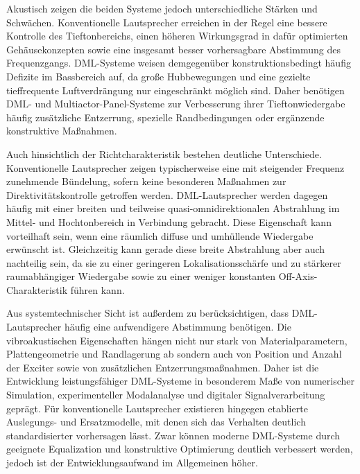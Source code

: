 Akustisch zeigen die beiden Systeme jedoch unterschiedliche Stärken und Schwächen. Konventionelle Lautsprecher erreichen in der Regel eine bessere Kontrolle des Tieftonbereichs, einen höheren Wirkungsgrad in dafür optimierten Gehäusekonzepten sowie eine insgesamt besser vorhersagbare Abstimmung des Frequenzgangs.
DML-Systeme weisen demgegenüber konstruktionsbedingt häufig Defizite im Bassbereich auf, da große Hubbewegungen und eine gezielte tieffrequente Luftverdrängung nur eingeschränkt möglich sind. Daher benötigen DML- und Multiactor-Panel-Systeme zur Verbesserung ihrer Tieftonwiedergabe häufig zusätzliche Entzerrung, spezielle Randbedingungen oder ergänzende konstruktive Maßnahmen.

Auch hinsichtlich der Richtcharakteristik bestehen deutliche Unterschiede. Konventionelle Lautsprecher zeigen typischerweise eine mit steigender Frequenz zunehmende Bündelung, sofern keine besonderen Maßnahmen zur Direktivitätskontrolle getroffen werden. DML-Lautsprecher werden dagegen häufig mit einer breiten und teilweise quasi-omnidirektionalen Abstrahlung im Mittel- und Hochtonbereich in Verbindung gebracht. Diese Eigenschaft kann vorteilhaft sein, wenn eine räumlich diffuse und umhüllende Wiedergabe erwünscht ist. Gleichzeitig kann gerade diese breite Abstrahlung aber auch nachteilig sein, da sie zu einer geringeren Lokalisationsschärfe und zu stärkerer raumabhängiger Wiedergabe sowie zu einer weniger konstanten Off-Axis-Charakteristik führen kann.

Aus systemtechnischer Sicht ist außerdem zu berücksichtigen, dass DML-Lautsprecher häufig eine aufwendigere Abstimmung benötigen. Die vibroakustischen Eigenschaften hängen nicht nur stark von Materialparametern, Plattengeometrie und Randlagerung ab sondern auch von Position und Anzahl der Exciter sowie von zusätzlichen Entzerrungsmaßnahmen. Daher ist die Entwicklung leistungsfähiger DML-Systeme in besonderem Maße von numerischer Simulation, experimenteller Modalanalyse und digitaler Signalverarbeitung geprägt.
Für konventionelle Lautsprecher existieren hingegen etablierte Auslegungs- und Ersatzmodelle, mit denen sich das Verhalten deutlich standardisierter vorhersagen lässt. Zwar können moderne DML-Systeme durch geeignete Equalization und konstruktive Optimierung deutlich verbessert werden, jedoch ist der Entwicklungsaufwand im Allgemeinen höher.

